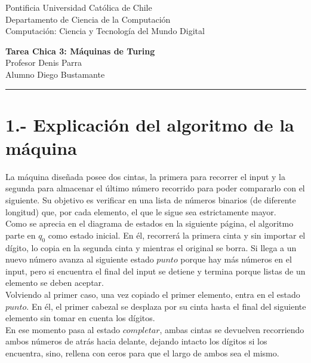 \documentclass[12pt]{article}
\begin{document}
\begin{flushleft}
{\footnotesize Pontificia Universidad Católica de Chile\\
Departamento de Ciencia de la Computación\\
Computación: Ciencia y Tecnología del Mundo Digital\\
}
\begin{center}
{\huge\bf Tarea Chica 3: Máquinas de Turing}\\ \vspace{0.5cm}
Profesor Denis Parra \\
Alumno Diego Bustamante\\

\rule{\linewidth}{0.1mm}
\end{center}
\end{flushleft}

\section*{\small 1.- Explicación del algoritmo de la máquina}

La máquina diseñada posee dos cintas, la primera para recorrer el input y la segunda para almacenar el último número recorrido para poder compararlo con el siguiente. Su objetivo es verificar en una lista de números binarios (de diferente longitud) que, por cada elemento, el que le sigue sea estrictamente mayor.\\

Como se aprecia en el diagrama de estados en la siguiente página, el algoritmo parte en $q_{0}$ como estado inicial. En él, recorrerá la primera cinta y sin importar el dígito, lo copia en la segunda cinta y mientras el original se borra. Si llega a un nuevo número avanza al siguiente estado $punto$ porque hay más números en el input, pero si encuentra el final del input se detiene y termina porque listas de un elemento se deben aceptar.\\

Volviendo al primer caso, una vez copiado el primer elemento, entra en el estado $punto$. En él, el primer cabezal se desplaza por su cinta hasta el final del siguiente elemento sin tomar en cuenta los dígitos.\\

En ese momento pasa al estado $completar$, ambas cintas se devuelven recorriendo ambos números de atrás hacia delante, dejando intacto los dígitos si los encuentra, sino, rellena con ceros para que el largo de ambos sea el mismo.\\
\end{document}
